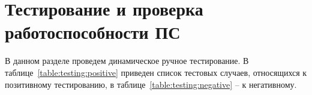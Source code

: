 \section{Тестирование и проверка работоспособности ПС}
\label{sec:testing}

В данном разделе проведем динамическое ручное тестирование. В таблице~\ref{table:testing:positive} приведен список тестовых случаев, относящихся к позитивному тестированию, в таблице~\ref{table:testing:negative} -- к негативному.

\newcommand\testnumber{\stepcounter{testnumber}\arabic{testnumber}}

\renewcommand{\labelenumi}{\arabic{enumi})}
\renewcommand{\labelenumii}{\asbuk{enumii})}

